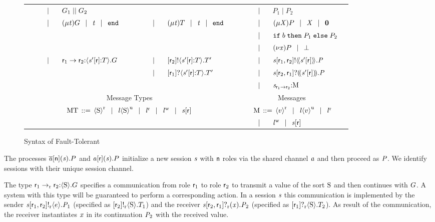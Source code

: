 \begin{figure}[t]
\begin{tabular}{|llclr|llclr|llclr|}
		& & $ \sepTerms $ & $ \GPar{\GT_1}{\GT_2} $ & & &&&&& & & $ \sepTerms $ & $ P_1 \mid P_2 $ &\\
		& & $ \sepTerms $ & $ \GRep{\TypeV}{\GT} \sepTerms \TypeV \sepTerms \GEnd $ & & & & $ \sepTerms $ & $ \LRep{\TypeV}{\LT} \sepTerms \TypeV \sepTerms \LEnd $ & & & & $ \sepTerms $ & $ \PRep{\ProcV}{P} \sepTerms \ProcV \sepTerms \PEnd $ &\\
		&&&&& &&&&& & & $ \sepTerms $ & $ \PITE{\Expr[b]}{P_1}{P_2} $ &\\
		&&&&& &&&&& & & $ \sepTerms $ & $ \PRes{\Args}{P} \sepTerms \PCrash $ &\\
		& & \multirow{2}{*}{$ \sepTerms $} & \multirow{2}{*}{$ \GDel{\Role_1}{\Role_2}{\Chan'}{\Role}{\LT}{\GT} $} & & & & $ \sepTerms $ & $ \LDelA{\Role_2}{\Chan'}{\Role}{\LT}{\LT'} $ & & & & $ \sepTerms $ & $ \PDelA{\Chan}{\Role_1}{\Role_2}{\AT{\Chan'}{\Role}}{\PT} $ &\\
		&&&&& & & $ \sepTerms $ & $ \LDelB{\Role_1}{\Chan'}{\Role}{\LT}{\LT'} $ && & & $ \sepTerms $ & $ \PDelB{\Chan}{\Role_2}{\Role_1}{\AT{\Chan'}{\Role}}{\PT} $ &\\
		&&&&& &&&&& & & $ \sepTerms $ & $ \MQ{\Chan}{\Role_1}{\Role_2}{\Queue} $ &\\
		\hline
		\multicolumn{10}{|c|}{Message Types} & \multicolumn{5}{c|}{Messages}\\
		\multicolumn{10}{|c|}{\multirow{2}{*}{$ \MT \deffTerms \MessR{\Sort} \sepTerms \MessU{\Label}{\Sort} \sepTerms \MessBR{\Label} \sepTerms \MessBW{\Label} \sepTerms \AT{\Chan}{\Role} $}} & \multicolumn{5}{c|}{$ \; \Queue \deffTerms \MessR{\Expr[v]} \sepTerms \MessU{\Label}{\Expr[v]} \sepTerms \MessBR{\Label} $}\\
		\multicolumn{10}{|c|}{} &&& $ \sepTerms $ & $ \MessBW{\Label} \sepTerms \AT{\Chan}{\Role} $ &\\
		\hline
	\end{tabular}
	\caption{Syntax of Fault-Tolerant \MPST{}}
	\label{fig:syntax}
\end{figure}

The processes $ \PReq{\Chan[a]}{\Role[n]}{\Chan}{P} $ and $ \PAcc{\Chan[a]}{\Role}{\Chan}{P} $ initialize a new session $ \Chan $ with $ \Role[n] $ roles via the shared channel $ \Chan[a] $ and then proceed as $ \PT $. We identify sessions with their unique session channel.

The type $ \GComR{\Role_1}{\Role_2}{\Sort}{\GT} $ specifies a \strongR communication from role $ \Role_1 $ to role $ \Role_2 $ to transmit a value of the sort $ \Sort $ and then continues with $ \GT $.
A system with this type will be guaranteed to perform a corresponding action.
In a session $ \Chan $ this communication is implemented by the sender $ \PSendR{\Chan}{\Role_1}{\Role_2}{\Expr}{\PT_1} $ (specified as $ \LSendR{\Role_2}{\Sort}{\LT_1} $) and the receiver $ \PGetR{\Chan}{\Role_2}{\Role_1}{\Args}{\PT_2} $ (specified as $ \LGetR{\Role_1}{\Sort}{\LT_2} $).
As result of the communication, the receiver instantiates $ \Args $ in its continuation $ \PT_2 $ with the received value.

